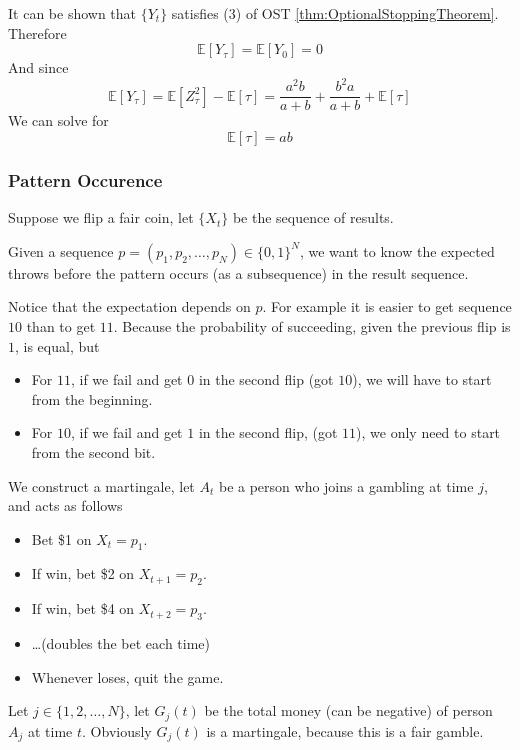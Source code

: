             It can be shown that $\{Y_t\}$ satisfies (3) of OST \ref{thm:OptionalStoppingTheorem}. Therefore
            \[ \mathbb{E}[Y_{\tau}] = \mathbb{E}[Y_0] = 0 \]
            And since
            \[ \mathbb{E}[Y_{\tau}] = \mathbb{E}[Z_{\tau}^2] - \mathbb{E}[\tau] = \frac{a^2b}{a+b} + \frac{b^2a}{a+b} + \mathbb{E}[\tau] \]
            We can solve for
            \[ \mathbb{E}[\tau] = ab \]

        \subsubsection{Pattern Occurence}
            Suppose we flip a fair coin, let $\{X_t\}$ be the sequence of results. 
            
            Given a sequence $p = (p_1,p_2,\dots,p_N) \in \{0,1\}^N$, we want to know the expected throws before the pattern occurs (as a subsequence) in the result sequence.

            Notice that the expectation depends on $p$. For example it is easier to get sequence $10$ than to get $11$. Because the probability of succeeding, given the previous flip is $1$, is equal, but
            \begin{itemize}
                \item For $11$, if we fail and get $0$ in the second flip (got $10$), we will have to start from the beginning.
                \item For $10$, if we fail and get $1$ in the second flip, (got $11$), we only need to start from the second bit.
            \end{itemize}

            We construct a martingale, let $A_t$ be a person who joins a gambling at time $j$, and acts as follows
            \begin{itemize}
                \item Bet \$1 on $X_t=p_1$.
                \item If win, bet \$2 on $X_{t+1}=p_2$.
                \item If win, bet \$4 on $X_{t+2}=p_3$.
                \item \dots (doubles the bet each time)
                \item Whenever loses, quit the game.
            \end{itemize}

            Let $j \in \{1, 2, \dots, N\}$, let $G_j(t)$ be the total money (can be negative) of person $A_j$ at time $t$. Obviously $G_j(t)$ is a martingale, because this is a fair gamble.

